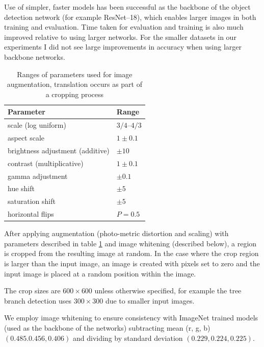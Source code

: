 Use of simpler, faster models has been successful as the backbone of the object detection network (for example ResNet--18), which enables larger images in both training and evaluation. Time taken for evaluation and training is also much improved relative to using larger networks. For the smaller datasets in our experiments I did not see large improvements in accuracy when using larger backbone networks.

\begin{table}[h]
  \centering
    \caption{Ranges of parameters used for image augmentation, translation occurs as part of a cropping process}
    
  \begin{tabular}{ l  l }
    Parameter & Range \\
    \toprule
    scale (log uniform) & ${3/4}$--${4/3}$  \\ 
    aspect scale  & $ 1 \pm 0.1 $  \\ 

    brightness adjustment (additive) & $ \pm 10 $ \\ 
    contrast (multiplicative) & $ 1 \pm 0.1 $ \\ 

    gamma adjustment & $ \pm 0.1 $ \\ 

    hue shift & $ \pm 5 $ \\ 
    saturation shift & $ \pm 5 $ \\ 
    
    horizontal flips & $ P = 0.5 $ \\ 
    
    \bottomrule
  \end{tabular}
\label{fig:obj_augmentation}
\end{table}

After applying augmentation (photo-metric distortion and scaling) with parameters described in table \ref{fig:obj_augmentation} and image whitening (described below), a region is cropped from the resulting image at random. In the case where the crop region is larger than the input image, an image is created with pixels set to zero and the input image is placed at a random position within the image.

The crop sizes are $600\times600$ unless otherwise specified, for example the tree branch detection uses $300\times300$ due to smaller input images.


We employ image whitening to ensure consistency with ImageNet trained models (used as the backbone of the networks) subtracting mean (r, g, b) $ (0.485. 0.456, 0.406) $ and dividing by standard deviation $ (0.229, 0.224, 0.225) $.


